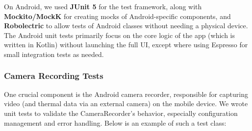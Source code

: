 On Android, we used \textbf{JUnit 5} for the test framework, along with
\textbf{Mockito/MockK} for creating mocks of Android-specific components, and
\textbf{Robolectric} to allow tests of Android classes without needing a
physical device. The Android unit tests primarily focus on the core
logic of the app (which is written in Kotlin) without launching the full
UI, except where using Espresso for small integration tests as needed.

\subsubsection{Camera Recording Tests}

One crucial component is the Android camera recorder, responsible for
capturing video (and thermal data via an external camera) on the mobile
device. We wrote unit tests to validate the CameraRecorder's behavior,
especially configuration management and error handling. Below is an
example of such a test class:

